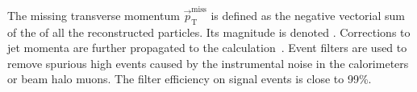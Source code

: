 The missing transverse momentum $\vec{p}_{\mathrm{T}}^{\mathrm{miss}}$ is defined as the negative vectorial sum of the \pt of all the reconstructed particles. Its magnitude is denoted \MET. Corrections to jet momenta are further propagated to the \MET calculation~\cite{CMS-PAS-JME-16-004}. Event filters \cite{CMS-PAS-JME-16-004} are used to remove spurious high \MET events caused by the instrumental noise in the calorimeters or beam halo muons. The filter efficiency on signal events is close to 99\%.


